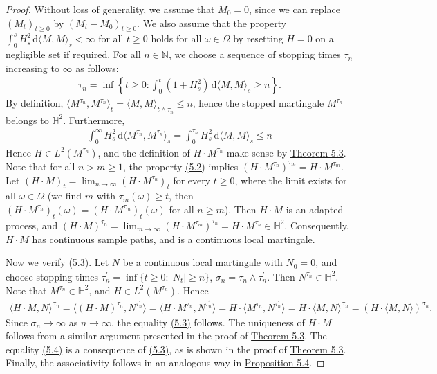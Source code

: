 \documentclass{article}
\numberwithin{equation}{section}
\renewcommand{\d}{\mathrm{d}}
\theoremstyle{plain}
\theoremstyle{definition}
\begin{document}
\begin{proof}
Without loss of generality, we assume that $M_0=0$, since we can replace $(M_t)_{t\geq 0}$ by $(M_t-M_0)_{t\geq 0}$. We also assume that the property $\int_0^sH_s^2\,\d \langle M,M\rangle_s<\infty$ for all $t\geq 0$ holds for all $\omega\in\Omega$ by resetting $H=0$ on a negligible set if required. For all $n\in\mathbb{N}$, we choose a sequence of stopping times $\tau_n$ increasing to $\infty$ as follows:
\begin{align*}
	\tau_n=\inf\left\{t\geq 0:\int_0^t (1+H_s^2)\,\d \langle M,M\rangle_s\geq n\right\}.
\end{align*}
By definition, $\langle M^{\tau_n},M^{\tau_n}\rangle_t=\langle M,M\rangle_{t\wedge\tau_n}\leq n$, hence the stopped martingale $M^{\tau_n}$ belongs to $\mathbb{H}^2$. Furthermore,
\begin{align*}
	\int_0^\infty H_s^2\,\d \langle M^{\tau_n},M^{\tau_n}\rangle_s = \int_0^{\tau_n}H_s^2\,\d \langle M,M\rangle_s \leq n
\end{align*}
Hence $H\in L^2(M^{\tau_n})$, and the definition of $H\cdot M^{\tau_n}$ make sense by \hyperref[thm:5.3]{Theorem 5.3}. Note that for all $n>m\geq 1$, the property \hyperref[eq:5.2]{(5.2)} implies $(H\cdot M^{\tau_n})^{\tau_m}=H\cdot M^{\tau_m}$. Let $(H\cdot M)_t=\lim_{n\to\infty} (H\cdot M^{\tau_n})_t$ for every $t\geq 0$, where the limit exists for all $\omega\in\Omega$ (we find $m$ with $\tau_{m}(\omega)\geq t$, then $(H\cdot M^{\tau_{n}})_t(\omega)=(H\cdot M^{\tau_{m}})_t(\omega)$ for all $n\geq m$).
Then $H\cdot M$ is an adapted process, and $(H\cdot M)^{\tau_n}=\lim_{m\to\infty}(H\cdot M^{\tau_m})^{\tau_n}= H\cdot M^{\tau_n}\in\mathbb{H}^2$. Consequently, $H\cdot M$ has continuous sample paths, and is a continuous local martingale.

Now we verify \hyperref[eq:5.3]{(5.3)}. Let $N$ be a continuous local martingale with $N_0=0$, and choose stopping times $\tau_n^\prime=\inf\{t\geq 0:\vert N_t\vert\geq n\}$, $\sigma_n=\tau_n\wedge\tau_n^\prime$. Then $N^{\tau_n^\prime}\in\mathbb{H}^2$. Note that $M^{\tau_n}\in\mathbb{H}^2$, and $H\in L^2(M^{\tau_n})$. Hence
\begin{align*}
	\langle H\cdot M,N\rangle^{\sigma_n} = \langle(H\cdot M)^{\tau_n},N^{\tau_n^\prime}\rangle = \langle H\cdot M^{\tau_n},N^{\tau_n^\prime}\rangle = H\cdot\langle M^{\tau_n},N^{\tau_n^\prime}\rangle = H\cdot \langle M,N\rangle^{\sigma_n} = (H\cdot\langle M,N\rangle)^{\sigma_n}.
\end{align*}
Since $\sigma_n\to\infty$ as $n\to\infty$, the equality \hyperref[eq:5.3]{(5.3)} follows. The uniqueness of $H\cdot M$ follows from a similar argument presented in the proof of \hyperref[thm:5.3]{Theorem 5.3}. The equality \hyperref[eq:5.4]{(5.4)} is a consequence of \hyperref[eq:5.3]{(5.3)}, as is shown in the proof of \hyperref[thm:5.3]{Theorem 5.3}. Finally, the associativity follows in an analogous way in \hyperref[prop:5.4]{Proposition 5.4}.
\end{proof}
\end{document}
